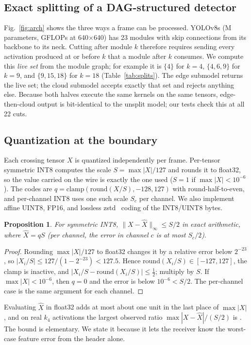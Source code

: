 \documentclass[journal,twocolumn,10pt]{IEEEtran}
\newtheorem{proposition}{Proposition}
\newcommand{\figref}[1]{Fig.~\ref{#1}}
\begin{document}
\subsection{Exact splitting of a DAG-structured detector}
\figref{fig:arch} shows the three ways a frame can be processed. YOLOv8s (\TotalParamsM{}M parameters, \TotalGFLOPs{} GFLOPs at 640$\times$640) has 23 modules with skip connections from its backbone to its neck. Cutting after module $k$ therefore requires sending every activation produced at or before $k$ that a module after $k$ consumes. We compute this \emph{live set} from the module graph; for example it is $\{4\}$ for $k{=}4$, $\{4,6,9\}$ for $k{=}9$, and $\{9,15,18\}$ for $k{=}18$ (Table~\ref{tab:splits}). The edge submodel returns the live set; the cloud submodel accepts exactly that set and rejects anything else. Because both halves execute the same kernels on the same tensors, edge-then-cloud output is bit-identical to the unsplit model; our tests check this at all 22 cuts.

\subsection{Quantization at the boundary}
Each crossing tensor $X$ is quantized independently per frame. Per-tensor symmetric INT8 computes the scale $S=\max|X|/127$ and rounds it to float32, so the value carried on the wire is exactly the one used ($S=1$ if $\max|X|<10^{-6}$). The codes are $q=\mathrm{clamp}(\mathrm{round}(X/S),-128,127)$ with round-half-to-even, and per-channel INT8 uses one such scale $S_c$ per channel. We also implement affine UINT8, FP16, and lossless zstd~\cite{rfc8878zstd} coding of the INT8/UINT8 bytes.
\begin{proposition}\label{prop:int8}
For symmetric INT8, $\|X-\hat X\|_\infty \le S/2$ in exact arithmetic, where $\hat X = qS$ (per channel, the error in channel $c$ is at most $S_c/2$).
\end{proposition}
\begin{proof}
Rounding $\max|X|/127$ to float32 changes it by a relative error below $2^{-23}$, so $|X_i/S|\le127/(1-2^{-23})<127.5$. Hence $\mathrm{round}(X_i/S)\in[-127,127]$, the clamp is inactive, and $|X_i/S-\mathrm{round}(X_i/S)|\le\frac12$; multiply by $S$. If $\max|X|<10^{-6}$, then $q=0$ and the error is below $10^{-6}<S/2$. The per-channel case is the same argument for each channel.
\end{proof}
Evaluating $\hat X$ in float32 adds at most about one unit in the last place of $\max|X|$, and on real $k_4$ activations the largest observed ratio $\max|X-\hat X|/(S/2)$ is \BoundRatioMax{}. The bound is elementary. We state it because it lets the receiver know the worst-case feature error from the header alone.
\end{document}
